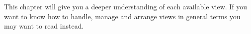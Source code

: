 This chapter will give you a deeper understanding of each available view. If you want to know how to handle, manage and arrange views in general terms you may want to read  instead. 